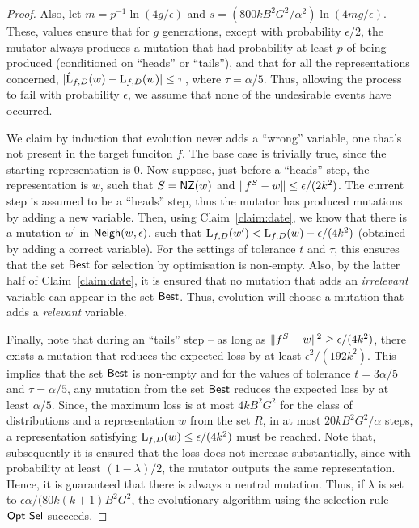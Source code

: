 \begin{proof}
Also, let $m = p^{-1}\ln(4g/\epsilon)$ and $s = (800 kB^2G^2/\alpha^2)
\ln(4mg/\epsilon)$. These, values ensure that for $g$ generations, except with
probability $\epsilon/2$, the mutator always produces a mutation that had
probability at least $p$ of being produced (conditioned on ``heads'' or
``tails''), and that for all the representations concerned, $|\hat{\mathrm{L}}_{f,
D}(w) - \mathrm{L}_{f, D}(w)| \leq \tau$, where $\tau = \alpha/5$. Thus, allowing the
process to fail with probability $\epsilon$, we assume that none of the
undesirable events have occurred.

We claim by induction that evolution never adds a ``wrong'' variable, \ie one
that's not present in the target funciton $f$. The base case is trivially true,
since the starting representation is $0$. Now suppose, just before a ``heads''
step, the representation is $w$, such that $S = \mathsf{NZ}(w)$ and $\Vert f^S - w \Vert
\leq \epsilon/(2k^2)$. The current step is assumed to be a ``heads'' step, thus
the mutator has produced mutations by adding a new variable. Then, using
Claim~\ref{claim:date}, we know that there is a mutation $w^\prime$ in $\mathsf{Neigh}(w,
\epsilon)$, such that $\mathrm{L}_{f, D}(w^\prime) < \mathrm{L}_{f, D}(w) -
\epsilon/(4k^2)$ (obtained by adding a correct variable). For the settings of
tolerance $t$ and $\tau$, this ensures that the set $\mathsf{Best}$ for selection by
optimisation is non-empty. Also, by the latter half of Claim~\ref{claim:date},
it is ensured that no mutation that adds an \emph{irrelevant} variable can
appear in the set $\mathsf{Best}$. Thus, evolution will choose a mutation that adds a
\emph{relevant} variable.

Finally, note that during an ``tails'' step -- as long as $\Vert f^S - w \Vert^2
\geq \epsilon/(4k^2)$, there exists a mutation that reduces the expected loss by
at least $\epsilon^2/(192k^2)$. This implies that the set $\mathsf{Best}$ is non-empty
and for the values of tolerance $t = 3\alpha/5$ and $\tau = \alpha/5$, any
mutation from the set $\mathsf{Best}$ reduces the expected loss by at least $\alpha/5$.
Since, the maximum loss is at most $4kB^2G^2$ for the class of distributions and
a representation $w$ from the set $R$, in at most $20kB^2G^2/\alpha$ steps, a
representation satisfying $\mathrm{L}_{f, D}(w) \leq \epsilon/(4k^2)$ must be
reached. Note that, subsequently it is ensured that the loss does not increase
substantially, since with probability at least $(1 - \lambda)/2$, the mutator
outputs the same representation. Hence, it is guaranteed that there is always a
neutral mutation. Thus, if $\lambda$ is set to $\epsilon\alpha/(80
k(k+1)B^2G^2$, the evolutionary algorithm using the selection rule $\mathsf{Opt\mbox{-}Sel}$
succeeds.

\end{proof}


